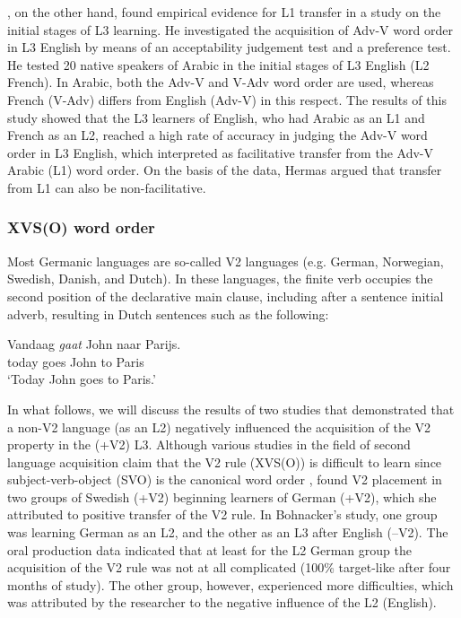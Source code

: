 \documentclass[output=paper]{langsci/langscibook}
\begin{document}
\citet{Hermas2010}, on the other hand, found empirical evidence for L1 transfer in a study on the initial stages of L3 learning. He investigated the acquisition of Adv-V word order in L3 English by means of an acceptability judgement test and a preference test. He tested 20 native speakers of Arabic in the initial stages of L3 English (L2 French). In Arabic, both the Adv-V and V-Adv word order are used, whereas French (V-Adv) differs from English (Adv-V) in this respect. The results of this study showed that the L3 learners of English, who had Arabic as an L1 and French as an L2, reached a high rate of accuracy in judging the Adv-V word order in L3 English, which \citet{Hermas2010} interpreted as facilitative transfer from the Adv-V Arabic (L1) word order. On the basis of the data, Hermas argued that transfer from L1 can also be non-facilitative.

\subsubsection{{XVS(O) word order}}

Most Germanic languages are so-called V2 languages (e.g. German, Norwegian, Swedish, Danish, and Dutch). In these languages, the finite verb occupies the second position of the declarative main clause, including after a sentence initial adverb, resulting in Dutch sentences such as the following:

\ea%
\label{ex:stadt:1}
\gll Vandaag \textit{gaat} John naar Parijs.\\
today goes John to Paris\\
\glt ‘Today John goes to Paris.’
\z


In what follows, we will discuss the results of two studies that demonstrated that a non-V2 language (as an L2) negatively influenced the acquisition of the V2 property in the (+V2) L3. Although various studies in the field of second language acquisition claim that the V2 rule (XVS(O)) is difficult to learn since subject-verb-object (SVO) is the canonical word order \citep{KleinPerdue1997, Pienemann1998, WahlstromMcKay2001, Bohnacker2006}, \citet{Bohnacker2006} found V2 placement in two groups of Swedish (+V2) beginning learners of German (+V2), which she attributed to positive transfer of the V2 rule. In Bohnacker’s study, one group was learning German as an L2, and the other as an L3 after English (–V2). The oral production data indicated that at least for the L2 German group the acquisition of the V2 rule was not at all complicated (100\% target-like after four months of study). The other group, however, experienced more difficulties, which was attributed by the researcher to the negative influence of the L2 (English).
\end{document}
